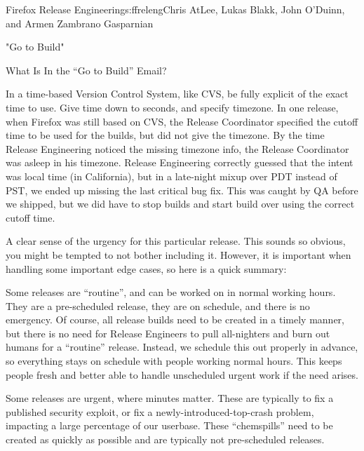 \begin{aosachapter}{Firefox Release Engineering}{s:ffreleng}{Chris AtLee, Lukas Blakk, John O'Duinn, and Armen Zambrano Gasparnian}
\begin{aosasect1}{"Go to Build"}
\begin{aosasect2}{What Is In the ``Go to Build'' Email?}
\begin{aosaenumerate}
\begin{aosaenumerate2}
    \item In a time-based Version Control System, like CVS, be fully
      explicit of the exact time to use. Give time down to seconds,
      and specify timezone. In one release, when Firefox was still
      based on CVS, the Release Coordinator specified the cutoff time
      to be used for the builds, but did not give the timezone. By the
      time Release Engineering noticed the missing timezone info, the
      Release Coordinator was asleep in his timezone. Release
      Engineering correctly guessed that the intent was local time (in
      California), but in a late-night mixup over PDT instead of PST,
      we ended up missing the last critical bug fix. This was caught
      by QA before we shipped, but we did have to stop builds and
      start build over using the correct cutoff time.

    \end{aosaenumerate2}

\item A clear sense of the urgency for this particular release.  This
  sounds so obvious, you might be tempted to not bother including
  it. However, it is important when handling some important edge
  cases, so here is a quick summary:

  \begin{aosaenumerate2}

    \item Some releases are ``routine'', and can be worked on in
      normal working hours. They are a pre-scheduled release, they are
      on schedule, and there is no emergency. Of course, all release
      builds need to be created in a timely manner, but there is no
      need for Release Engineers to pull all-nighters and burn out
      humans for a ``routine'' release.  Instead, we schedule this out
      properly in advance, so everything stays on schedule with people
      working normal hours. This keeps people fresh and better able to
      handle unscheduled urgent work if the need arises.

    \item Some releases are urgent, where minutes matter. These are
      typically to fix a published security exploit, or fix a
      newly-introduced-top-crash problem, impacting a large percentage
      of our userbase. These ``chemspills'' need to be created as
      quickly as possible and are typically not pre-scheduled
      releases.


\end{aosaenumerate2}
\end{aosaenumerate}
\end{aosasect2}
\end{aosasect1}
\end{aosachapter}
